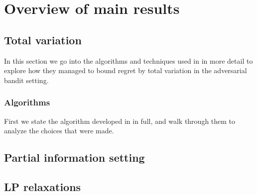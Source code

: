 \section{Overview of main results}

\subsection{Total variation}
In this section we go into the algorithms and techniques used in \citep{hazan}
in more detail to explore how they managed to bound regret by total variation in the
adversarial bandit setting.

\subsubsection{Algorithms}
First we state the algorithm developed in \citep{hazan} in full, and walk through them
to analyze the choices that were made.





\subsection{Partial information setting}
\subsection{LP relaxations}
